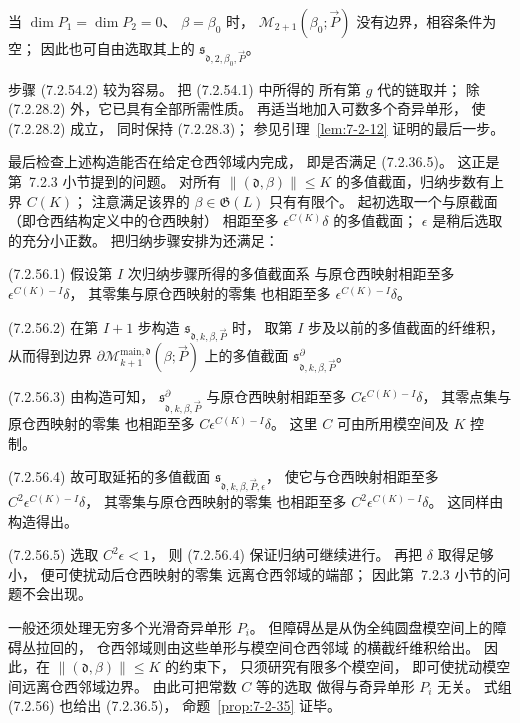 当 $\dim P_1=\dim P_2=0$、
$\beta=\beta_0$ 时，
$\mathcal M_{2+1}(\beta_0;\vec P)$
没有边界，相容条件为空；
因此也可自由选取其上的
$\mathfrak s_{\mathfrak d,2,\beta_0,\vec P}$。

步骤 (7.2.54.2) 较为容易。
把 (7.2.54.1) 中所得的
所有第 $g$ 代的链取并；
除 (7.2.28.2) 外，它已具有全部所需性质。
再适当地加入可数多个奇异单形，
使 (7.2.28.2) 成立，
同时保持 (7.2.28.3)；
参见引理~\ref{lem:7-2-12} 证明的最后一步。

最后检查上述构造能否在给定仓西邻域内完成，
即是否满足 (7.2.36.5)。
这正是第~7.2.3 小节提到的问题。
对所有
$\|(\mathfrak d,\beta)\|\le K$
的多值截面，归纳步数有上界 $C(K)$；
注意满足该界的
$\beta\in\mathfrak G(L)$ 只有有限个。
起初选取一个与原截面
（即仓西结构定义中的仓西映射）
相距至多 $\epsilon^{C(K)}\delta$
的多值截面；
$\epsilon$ 是稍后选取的充分小正数。
把归纳步骤安排为还满足：

\noindent\textup{(7.2.56.1)}\quad
假设第 $I$ 次归纳步骤所得的多值截面系
与原仓西映射相距至多
$\epsilon^{C(K)-I}\delta$，
其零集与原仓西映射的零集
也相距至多
$\epsilon^{C(K)-I}\delta$。

\noindent\textup{(7.2.56.2)}\quad
在第 $I+1$ 步构造
$\mathfrak s_{\mathfrak d,k,\beta,\vec P}$ 时，
取第 $I$ 步及以前的多值截面的纤维积，
从而得到边界
$\partial\mathcal M^{\mathrm{main},\mathfrak d}_{k+1}
(\beta;\vec P)$ 上的多值截面
$\mathfrak s^{\partial}_{\mathfrak d,k,\beta,\vec P}$。

\noindent\textup{(7.2.56.3)}\quad
由构造可知，
$\mathfrak s^{\partial}_{\mathfrak d,k,\beta,\vec P}$
与原仓西映射相距至多
$C\epsilon^{C(K)-I}\delta$，
其零点集与原仓西映射的零集
也相距至多
$C\epsilon^{C(K)-I}\delta$。
这里 $C$ 可由所用模空间及 $K$ 控制。

\noindent\textup{(7.2.56.4)}\quad
故可取延拓的多值截面
$\mathfrak s_{\mathfrak d,k,\beta,\vec P,\epsilon}$，
使它与仓西映射相距至多
$C^2\epsilon^{C(K)-I}\delta$，
其零集与原仓西映射的零集
也相距至多
$C^2\epsilon^{C(K)-I}\delta$。
这同样由构造得出。

\noindent\textup{(7.2.56.5)}\quad
选取 $C^2\epsilon<1$，
则 (7.2.56.4) 保证归纳可继续进行。
再把 $\delta$ 取得足够小，
便可使扰动后仓西映射的零集
远离仓西邻域的端部；
因此第~7.2.3 小节的问题不会出现。

一般还须处理无穷多个光滑奇异单形 $P_i$。
但障碍丛是从伪全纯圆盘模空间上的障碍丛拉回的，
仓西邻域则由这些单形与模空间仓西邻域
的横截纤维积给出。
因此，在 $\|(\mathfrak d,\beta)\|\le K$ 的约束下，
只须研究有限多个模空间，
即可使扰动模空间远离仓西邻域边界。
由此可把常数 $C$ 等的选取
做得与奇异单形 $P_i$ 无关。
式组 (7.2.56) 也给出 (7.2.36.5)，
命题~\ref{prop:7-2-35} 证毕。

